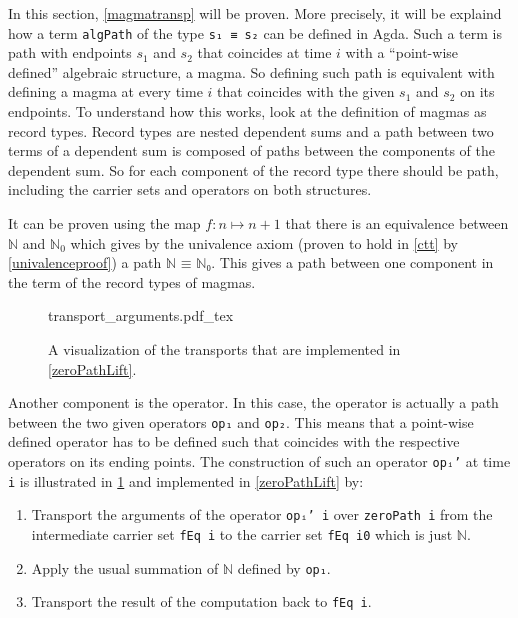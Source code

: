 \documentclass[12pt,a4paper,twoside,xetex]{book} %
\newcommand{\incfig}[1]{%
    \def\svgwidth{0.6\columnwidth}
    {#1.pdf_tex}
}
\begin{document}
In this section, \cref{magmatransp} will be proven. More precisely, it will be explaind how a term \texttt{algPath} of the type \texttt{s₁ ≡ s₂} can be defined in Agda. Such a term is path with endpoints $s_1$ and $s_2$ that coincides at time $i$ with a ``point-wise 
defined'' algebraic structure, a magma. So defining such path is equivalent 
with defining a magma at every time $i$ that coincides with the given $s_1$ and 
$s_2$ on its endpoints. To understand how this works, look at the definition of 
magmas as record types. Record types are nested dependent sums and a path 
between two terms of a dependent sum is composed of paths between the 
components of the dependent sum. So for each component of the record type there 
should be path, including the carrier sets and operators on both structures. 

It can be proven using the map $f: n \mapsto n + 1$ that there is an 
equivalence between $\mathbb{N}$ and $\mathbb{N}_0$ which gives by the 
univalence axiom (proven to hold in \cref{ctt} by \cref{univalenceproof}) a 
path $\texttt{ℕ ≡ ℕ₀}$. This gives a path between one component in the term of 
the record types of magmas. 

\begin{figure}\label{transpop}
\centering
\incfig{transport_arguments}
\caption{A visualization of the transports that are implemented in \cref{zeroPathLift}.}
\end{figure}

Another component is the operator. In this case, the operator is actually a 
path between the two given operators \texttt{op₁} and \texttt{op₂}. This means that a point-wise defined 
operator has to be defined such that coincides with the respective operators on its ending points. The construction of such an operator \texttt{opᵢ'} at time \texttt{i} is illustrated in \cref{transpop} and implemented in \cref{zeroPathLift} by:

\begin{enumerate}
\item Transport the arguments of the operator \texttt{opᵢ' i} over \texttt{zeroPath i} from the intermediate carrier set \texttt{fEq i} to the carrier set \texttt{fEq i0} which is just $\mathbb{N}$. 
\item Apply the usual summation of $\mathbb{N}$ defined by \texttt{op₁}.
\item Transport the result of the computation back to \texttt{fEq i}.
\end{enumerate}
\end{document}
